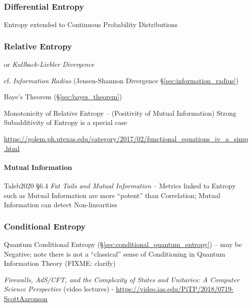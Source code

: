 \subsubsection{Differential Entropy}\label{sec:differential_entropy}

Entropy extended to Continuous Probability Distributions



\subsubsection{Relative Entropy}\label{sec:relative_entropy}

or \emph{Kullback-Liebler Divergence}

cf. \emph{Information Radius} (Jensen-Shannon Divergence
\S\ref{sec:information_radius})

\fist Baye's Theorem (\S\ref{sec:bayes_theorem})

Monotonicity of Relative Entropy -- (Positivity of Mutual Information) Strong
Subadditivity of Entropy is a special case

\url{https://golem.ph.utexas.edu/category/2017/02/functional_equations_iv_a_simp.html}



\paragraph{Mutual Information}\label{sec:mutual_information}\hfill

Taleb2020 \S 6.4 \emph{Fat Tails and Mutual Information} -- Metrics linked to
Entropy such as Mutual Information are more ``potent'' than Correlation; Mutual
Information can detect Non-linearities



\subsubsection{Conditional Entropy}\label{sec:conditional_entropy}

\fist Quantum Conditional Entropy (\S\ref{sec:conditional_quantum_entropy}) --
may be Negative; note there is not a ``classical'' sense of Conditioning in
Quantum Information Theory (FIXME: clarify)

\asterism

\emph{Firewalls, AdS/CFT, and the Complexity of States and Unitaries: A Computer
  Science Perspective}
(video lectures)
-
\url{https://video.ias.edu/PiTP/2018/0719-ScottAaronson}

